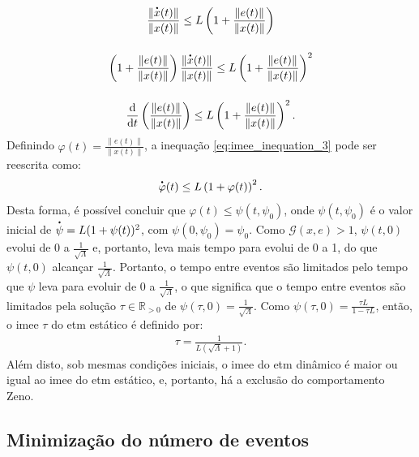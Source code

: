 \begin{gather}
  \frac{\|\dt{x}(t)\|}{\|x(t)\|} \leq L\left(1 + \frac{\|e(t)\|}{\|x(t)\|}\right) \notag \\[12pt]
  \left( 1 + \frac{\|e(t)\|}{\|x(t)\|} \right) \frac{\|\dt{x}(t)\|}{\|x(t)\|} \leq L\left( 1 + \frac{\|e(t)\|}{\|x(t)\|} \right) ^ 2 \notag \\[12pt]
  \frac{\mathrm{d}}{\mathrm{d}t}\left(\frac{\|e(t)\|}{\|x(t)\|}\right) \leq L\left( 1 + \frac{\|e(t)\|}{\|x(t)\|} \right) ^ 2.
  \label{eq:imee_inequation_3}
\end{gather} Definindo $\varphi (t) = \displaystyle \frac{\|e(t)\|}{\|x(t)\|}$, a inequação \eqref{eq:imee_inequation_3} pode ser reescrita como: \begin{equation}
  \dt{\varphi}(t) \leq L \left(1 + \varphi(t)\right)^2.
\end{equation} Desta forma, é possível concluir que $\varphi(t) \leq \psi(t, \psi_0)$, onde $\psi(t, \psi_0)$ é o valor inicial de $\dt{\psi} = L(1 + \psi(t))^2$, com $\psi(0, \psi_0) = \psi_0$. Como $\mathcal{G}(x, e) > 1$, $\psi(t, 0)$ evolui de 0 a $\frac{1}{\sqrt{\Lambda}}$ e, portanto, leva mais tempo para evolui de 0 a 1, do que $\psi(t, 0)$ alcançar $\frac{1}{\sqrt{\Lambda}}$. Portanto, o tempo entre eventos são limitados pelo tempo que $\psi$ leva para evoluir de 0 a $\frac{1}{\sqrt{\Lambda}}$, o que significa que o tempo entre eventos são limitados pela solução $\tau \in \mathbb{R}_{>0}$ de $\psi(\tau, 0) = \frac{1}{\sqrt{\Lambda}}$. Como $\psi(\tau, 0) = \frac{\tau L}{1 - \tau L}$, então, o \acrshort{imee} $\tau$ do \acrshort{etm} estático é definido por: \begin{gather}
  \tau = \frac{1}{L(\sqrt{\Lambda} + 1)}.
  \label{eq:imee_final_inequation}
\end{gather} Além disto, sob mesmas condições iniciais, o \acrshort{imee} do \acrshort{etm} dinâmico é maior ou igual ao \acrshort{imee} do \acrshort{etm} estático, e, portanto, há a exclusão do comportamento Zeno.

\subsection{Minimização do número de eventos}

